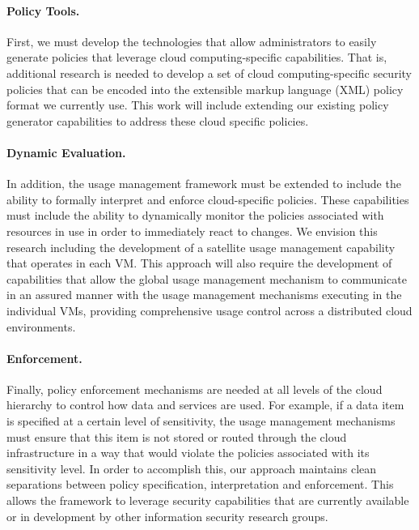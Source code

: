\documentclass[10pt,letterpaper]{article}
\begin{document}
\paragraph{Policy Tools.} First, we must develop the technologies that allow administrators to easily generate policies that leverage cloud computing-specific capabilities. That is, additional research is needed to develop a set of cloud computing-specific security policies that can be encoded into the extensible markup language (XML) policy format we currently use. This work will include extending our existing policy generator capabilities to address these cloud specific policies.

\paragraph{Dynamic Evaluation.} In addition, the usage management framework must be extended to include the ability to formally interpret and enforce cloud-specific policies. These capabilities must include the ability to dynamically monitor the policies associated with resources in use in order to immediately react to changes. We envision this research including the development of a satellite usage management capability that operates in each VM. This approach will also require the development of capabilities that allow the global usage management mechanism to communicate in an assured manner with the usage management mechanisms executing in the individual VMs, providing comprehensive usage control across a distributed cloud environments.

\paragraph{Enforcement.} Finally, policy enforcement mechanisms are needed at all levels of the cloud hierarchy to control how data and services are used. For example, if a data item is specified at a certain level of sensitivity, the usage management mechanisms must ensure that this item is not stored or routed through the cloud infrastructure in a way that would violate the policies associated with its sensitivity level. In order to accomplish this, our approach maintains clean separations between policy specification, interpretation and enforcement. This allows the framework to leverage security capabilities that are currently available or in development by other information security research groups.
\end{document}
